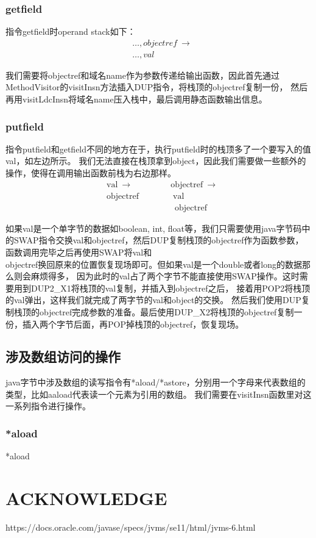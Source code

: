 \documentclass[UTF8]{article}
\begin{document}
\subsubsection{getfield}
指令getfield时operand stack如下：
\begin{equation*}
    \begin{split}
        &\ldots, objectref\ \rightarrow\\
        &\ldots, val
    \end{split}
\end{equation*}

我们需要将objectref和域名name作为参数传递给输出函数，因此首先通过MethodVisitor的visitInsn方法插入DUP指令，将栈顶的objectref复制一份，
然后再用visitLdcInsn将域名name压入栈中，最后调用静态函数输出信息。

\subsubsection{putfield}
指令putfield和getfield不同的地方在于，执行putfield时的栈顶多了一个要写入的值val，如左边所示。
我们无法直接在栈顶拿到object，因此我们需要做一些额外的操作，使得在调用输出函数前栈为右边那样。
\begin{equation*}
    \begin{split}
        &\text{val}\ \rightarrow\qquad\qquad\ \  \text{objectref}\ \rightarrow\\
        &\text{objectref}\qquad\qquad \text{val}\\
        &\qquad\qquad\qquad\qquad\text{objectref}
    \end{split}
\end{equation*}

如果val是一个单字节的数据如boolean, int, float等，我们只需要使用java字节码中的SWAP指令交换val和objectref，然后DUP复制栈顶的objectref作为函数参数，
函数调用完毕之后再使用SWAP将val和\\objectref换回原来的位置恢复现场即可。但如果val是一个double或者long的数据那么则会麻烦得多，
因为此时的val占了两个字节不能直接使用SWAP操作。这时需要用到DUP2\_X1将栈顶的val复制，并插入到objectref之后，
接着用POP2将栈顶的val弹出，这样我们就完成了两字节的val和object的交换。
然后我们使用DUP复制栈顶的objectref完成参数的准备。最后使用DUP\_X2将栈顶的objectref复制一份，插入两个字节后面，再POP掉栈顶的objectref，恢复现场。

\subsection{涉及数组访问的操作}
java字节中涉及数组的读写指令有*aload/*astore，分别用一个字母来代表数组的类型，比如aaload代表读一个元素为引用的数组。
我们需要在visitInsn函数里对这一系列指令进行操作。

\subsubsection{*aload}
*aload

\section{ACKNOWLEDGE}
https://docs.oracle.com/javase/specs/jvms/se11/html/jvms-6.html
\end{document}
